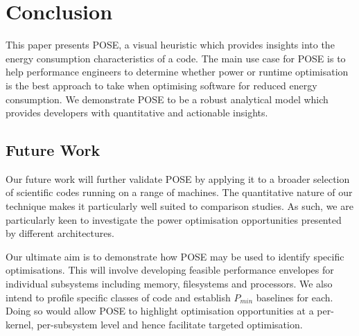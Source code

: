 \section{Conclusion}
\label{sec:conclusion}
This paper presents POSE, a visual heuristic which provides insights into the energy consumption characteristics of a code.
The main use case for POSE is to help performance engineers to determine whether power or runtime optimisation is the best approach to take when optimising software for reduced energy consumption.
We demonstrate POSE to be a robust analytical model which provides developers with quantitative and actionable insights.

\subsection{Future Work}
Our future work will further validate POSE by applying it to a broader selection of scientific codes running on a range of machines.
The quantitative nature of our technique makes it particularly well suited to comparison studies.
As such, we are particularly keen to investigate the power optimisation opportunities presented by different architectures.

Our ultimate aim is to demonstrate how POSE may be used to identify specific optimisations.
This will involve developing feasible performance envelopes for individual subsystems including memory, filesystems and processors. 
We also intend to profile specific classes of code and establish $P_{min}$ baselines for each.
Doing so would allow POSE to highlight optimisation opportunities at a per-kernel, per-subsystem level and hence facilitate targeted optimisation.
